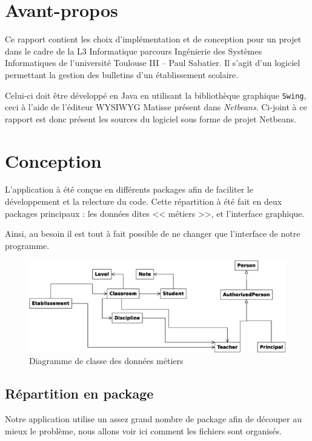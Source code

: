 \documentclass[a4paper, 11pt]{article}
\begin{document}
	\maketitle
	\section*{Avant-propos}
	Ce rapport contient les choix d'implémentation et de conception pour un projet dans le cadre de la L3 Informatique parcours Ingénierie des Systèmes
	Informatiques de l'université Toulouse III -- Paul Sabatier.
	Il s'agit d'un logiciel permettant la gestion des bulletins d'un établissement scolaire.

	Celui-ci doit être développé en Java en utilisant la bibliothèque graphique \texttt{Swing}, ceci à l'aide de l'éditeur WYSIWYG Matisse présent dans
	\textit{Netbeans}. Ci-joint à ce rapport est donc présent les sources du logiciel sous forme de projet Netbeans.

	\section{Conception}
		L'application à été conçue en différents packages afin de faciliter le développement et la relecture du code. Cette répartition à été fait en deux
		packages principaux : les données dites << métiers >>, et l'interface graphique. 
		
		Ainsi, au besoin il est tout à fait possible de ne changer que l'interface de notre programme. 

		\begin{figure}[H]
			\hspace{-36px}
			\includegraphics[width=20cm]{Diagramme1.eps}
			\caption{Diagramme de classe des données métiers}
			\label{fig:diagClasse}
		\end{figure}

		\subsection{Répartition en package}
		Notre application utilise un assez grand nombre de package afin de découper au mieux le problème, nous allons voir ici comment les fichiers sont
		organisés.
\end{document}
